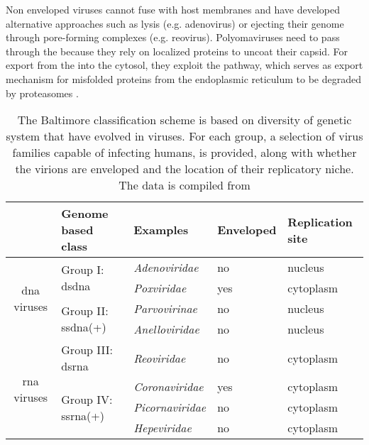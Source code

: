 Non enveloped viruses cannot fuse with host membranes and have developed alternative approaches such as lysis (e.g. adenovirus) or ejecting their genome through pore-forming complexes (e.g. reovirus). Polyomaviruses need to pass through the  because they rely on  localized proteins to uncoat their capsid. For export from the  into the cytosol, they exploit the  pathway, which serves as export mechanism for misfolded proteins from the endoplasmic reticulum to be degraded by proteasomes \citep{Smith2012}.

\renewcommand{\arraystretch}{1.5}

\begin{table}
  \centering
  \caption[The Baltimore classification scheme for viruses]{The Baltimore classification scheme is based on diversity of genetic system that have evolved in viruses. For each group, a selection of virus families capable of infecting humans, is provided, along with whether the virions are enveloped and the location of their replicatory niche. The data is compiled from \citet{Hulo2011}}
  \label{tab:baltimore-classification}
  \footnotesize
  \begin{tabular}{c|llll}
    & Genome based class & Examples & Enveloped & Replication site \\
    \hline \multirow{4}{*}{\begin{sideways}\acrshort{dna} viruses\end{sideways}} &
    \multirow{2}{*}{Group I: \acrshort{dsdna}} &
    \textit{Adenoviridae} &
    no & nucleus \\
    &
    & \textit{Poxviridae} &
    yes & cytoplasm \\
    \cline{2-5} &
    \multirow{2}{*}{Group II: \acrshort{ssdna}(+)} &
    \textit{Parvovirinae} &
    no & nucleus \\
    &
    & \textit{Anelloviridae} &
    no & nucleus \\
    \hline \multirow{6}{*}{\begin{sideways}\acrshort{rna} viruses\end{sideways}} &   
    Group III: \acrshort{dsrna} &
    \textit{Reoviridae} &
    no & cytoplasm \\
    \cline{2-5} &
    \multirow{3}{*}{Group IV: \acrshort{ssrna}(+)} &
    \textit{Coronaviridae} &
    yes & cytoplasm \\
    &
    & \textit{Picornaviridae} &
    no & cytoplasm \\
    &
    & \textit{Hepeviridae} &
    no & cytoplasm \\

\end{tabular}
\end{table}
